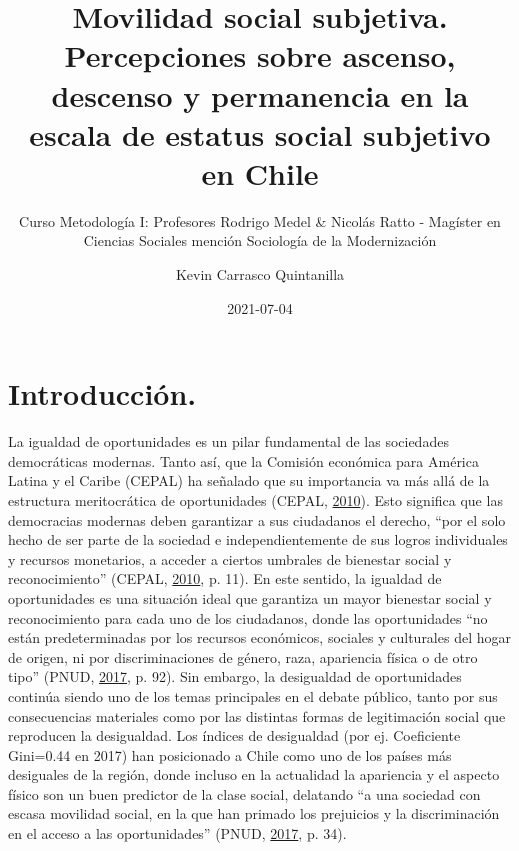 \documentclass[
]{article}
\title{\vspace{5cm} Movilidad social subjetiva. Percepciones sobre ascenso,
descenso y permanencia en la escala de estatus social subjetivo en Chile}
\subtitle{Curso Metodología I: Profesores Rodrigo Medel \& Nicolás Ratto -
Magíster en Ciencias Sociales mención Sociología de la Modernización}
\author{Kevin Carrasco Quintanilla}
\date{2021-07-04}
\begin{document}
\maketitle

\newpage

\hypertarget{introducciuxf3n.}{%
\section{Introducción.}\label{introducciuxf3n.}}

La igualdad de oportunidades es un pilar fundamental de las sociedades
democráticas modernas. Tanto así, que la Comisión económica para América
Latina y el Caribe (CEPAL) ha señalado que su importancia va más allá de
la estructura meritocrática de oportunidades (CEPAL,
\protect\hyperlink{ref-cepal_hora_2010}{2010}). Esto significa que las
democracias modernas deben garantizar a sus ciudadanos el derecho, ``por
el solo hecho de ser parte de la sociedad e independientemente de sus
logros individuales y recursos monetarios, a acceder a ciertos umbrales
de bienestar social y reconocimiento'' (CEPAL,
\protect\hyperlink{ref-cepal_hora_2010}{2010}, p. 11). En este sentido,
la igualdad de oportunidades es una situación ideal que garantiza un
mayor bienestar social y reconocimiento para cada uno de los ciudadanos,
donde las oportunidades ``no están predeterminadas por los recursos
económicos, sociales y culturales del hogar de origen, ni por
discriminaciones de género, raza, apariencia física o de otro tipo''
(PNUD, \protect\hyperlink{ref-pnud_Desiguales_2017}{2017}, p. 92). Sin
embargo, la desigualdad de oportunidades continúa siendo uno de los
temas principales en el debate público, tanto por sus consecuencias
materiales como por las distintas formas de legitimación social que
reproducen la desigualdad. Los índices de desigualdad (por ej.
Coeficiente Gini=0.44 en 2017) han posicionado a Chile como uno de los
países más desiguales de la región, donde incluso en la actualidad la
apariencia y el aspecto físico son un buen predictor de la clase social,
delatando ``a una sociedad con escasa movilidad social, en la que han
primado los prejuicios y la discriminación en el acceso a las
oportunidades'' (PNUD,
\protect\hyperlink{ref-pnud_Desiguales_2017}{2017}, p. 34).
\end{document}
